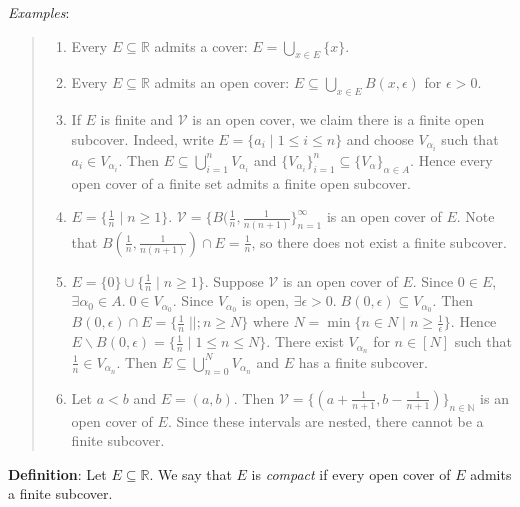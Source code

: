 \documentclass[11pt]{article}
\begin{document}
\emph{Examples}:
\begin{quote}\vspace{-0.3cm}
	\begin{enumerate}
	\item Every $E \subseteq \mathbb{R}$ admits a cover: $E = \bigcup_{x \in E} \{x\}$.
	\item Every $E \subseteq \mathbb{R}$ admits an open cover: $E \subseteq \bigcup_{x \in E} B(x, \epsilon)$ for $\epsilon > 0$.
	\item If $E$ is finite and $\mathcal{V}$ is an open cover, we claim there is a finite open subcover. Indeed, write $E = \{a_i \;|\; 1 \leq i \leq n\}$ and choose $V_{\alpha_i}$ such that $a_i \in V_{\alpha_i}$. Then $E \subseteq \bigcup_{i=1}^n V_{\alpha_i}$ and $\{V_{\alpha_i}\}_{i=1}^n \subseteq \{V_\alpha\}_{\alpha \in A}$. Hence every open cover of a finite set admits a finite open subcover.

	\item $E = \{\frac{1}{n} \;|\; n \geq 1\}$. $\mathcal{V} = \{B(\frac{1}{n}, \frac{1}{n(n+1)}\}_{n=1}^\infty$ is an open cover of $E$. Note that $B(\frac{1}{n}, \frac{1}{n(n+1)}) \cap E = \frac{1}{n}$, so there does not exist a finite subcover.

	\item $E = \{0\} \cup \{\frac{1}{n} \;|\; n \geq 1\}$. Suppose $\mathcal{V}$ is an open cover of $E$. Since $0 \in E$, $\exists \alpha_0 \in A.\; 0 \in V_{\alpha_0}$. Since $V_{\alpha_0}$ is open, $\exists \epsilon > 0.\; B(0, \epsilon) \subseteq V_{\alpha_0}$. Then $B(0, \epsilon) \cap E = \{\frac{1}{n} \;||; n \geq N\}$ where $N = \min \{n \in N \;|\; n \geq \frac{1}{\epsilon}\}$. Hence $E \backslash B(0, \epsilon) = \{\frac{1}{n} \;|\; 1 \leq n \leq N\}$. There exist $V_{\alpha_n}$ for $n \in [N]$ such that $\frac{1}{n} \in V_{\alpha_n}$. Then $E \subseteq \bigcup_{n=0}^N V_{\alpha_n}$ and $E$ has a finite subcover.

	\item Let $a < b$ and $E = (a,b)$. Then $\mathcal{V} = \{(a+\frac{1}{n+1}, b - \frac{1}{n+1})\}_{n \in \mathbb{N}}$ is an open cover of $E$. Since these intervals are nested, there cannot be a finite subcover.
	\end{enumerate}
\end{quote}

\textbf{Definition}: Let $E \subseteq \mathbb{R}$. We say that $E$ is \emph{compact} if every open cover of $E$ admits a finite subcover.
\end{document}
